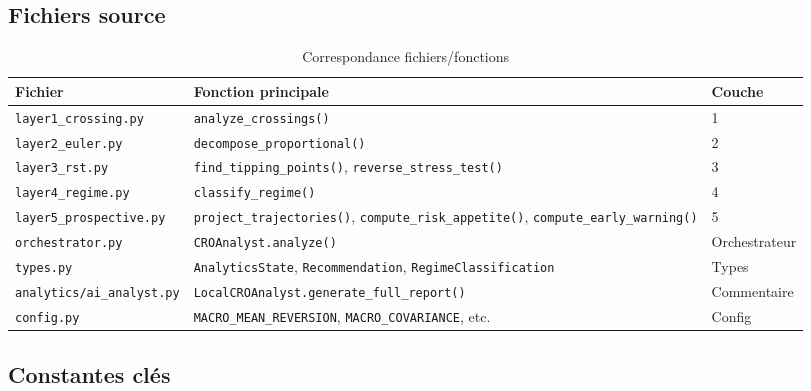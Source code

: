\documentclass[12pt,a4paper]{article}
\begin{document}
\subsection{Fichiers source}

\begin{table}[htbp]
\centering
\caption{Correspondance fichiers/fonctions}
\begin{tabular}{lll}
\toprule
\textbf{Fichier} & \textbf{Fonction principale} & \textbf{Couche} \\
\midrule
\texttt{layer1\_crossing.py} & \texttt{analyze\_crossings()} & 1 \\
\texttt{layer2\_euler.py} & \texttt{decompose\_proportional()} & 2 \\
\texttt{layer3\_rst.py} & \texttt{find\_tipping\_points()}, \texttt{reverse\_stress\_test()} & 3 \\
\texttt{layer4\_regime.py} & \texttt{classify\_regime()} & 4 \\
\texttt{layer5\_prospective.py} & \texttt{project\_trajectories()}, \texttt{compute\_risk\_appetite()}, \texttt{compute\_early\_warning()} & 5 \\
\texttt{orchestrator.py} & \texttt{CROAnalyst.analyze()} & Orchestrateur \\
\texttt{types.py} & \texttt{AnalyticsState}, \texttt{Recommendation}, \texttt{RegimeClassification} & Types \\
\texttt{analytics/ai\_analyst.py} & \texttt{LocalCROAnalyst.generate\_full\_report()} & Commentaire \\
\texttt{config.py} & \texttt{MACRO\_MEAN\_REVERSION}, \texttt{MACRO\_COVARIANCE}, etc. & Config \\
\bottomrule
\end{tabular}
\label{tab:source_files}
\end{table}

\subsection{Constantes cl\'es}
\end{document}
